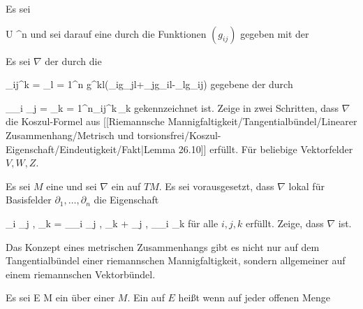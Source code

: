 {}
{

Es sei

\mavergleichskette
{\vergleichskette
{ U
}
{ \subseteq }{ \R^n
}
{  }{
}
{    }{
}
{   }{
}
}
{}{}{}
und sei darauf eine
durch die Funktionen $\left(  g_{ij}  \right)$ gegeben mit der

 Es sei $\nabla$ der durch die

\mavergleichskettedisp
{\vergleichskette
{ \Gamma_{ij}^k
}
{ =} { {  } \sum_{l = 1}^n g^{kl}(\partial_ig_{jl}+\partial_jg_{il}-\partial_lg_{ij})
}
{ } {
}
{ } {
}
{ } {
}
}
{}{}{}
gegebene
der durch

\mavergleichskettedisp
{\vergleichskette
{ \nabla_{\partial_i } \partial_j
}
{ =} { \sum_{k = 1}^n\Gamma_{ij}^k\,\partial_k
}
{ } {
}
{ } {
}
{ } {
}
}
{}{}{}
gekennzeichnet ist. Zeige in zwei Schritten, dass $\nabla$ die Koszul-Formel aus
[[Riemannsche Mannigfaltigkeit/Tangentialbündel/Linearer Zusammenhang/Metrisch und torsionsfrei/Koszul-Eigenschaft/Eindeutigkeit/Fakt|Lemma 26.10]]
erfüllt.
 {Für beliebige Vektorfelder $V,W,Z$.
}

}
{} {}

{}
{

Es sei $M$ eine
und sei $\nabla$ ein
auf $TM$. Es sei vorausgesetzt, dass $\nabla$ lokal für Basisfelder $\partial_1  , \ldots , \partial_n$ die Eigenschaft

\mavergleichskettedisp
{\vergleichskette
{ \partial_i \left\langle  \partial_j  ,  \partial_k   \right\rangle
}
{ =} { \left\langle \nabla_{\partial_i } \partial_j   ,  \partial_k   \right\rangle  + \left\langle  \partial_j  ,  \nabla_{\partial_i } \partial_k    \right\rangle
}
{ } {
}
{ } {
}
{ } {
}
}
{}{}{}
für alle $i,j,k$ erfüllt. Zeige, dass $\nabla$
ist.

}
{} {}

Das Konzept eines metrischen Zusammenhangs gibt es nicht nur auf dem Tangentialbündel einer riemannschen Mannigfaltigkeit, sondern allgemeiner auf einem riemannschen Vektorbündel.

Es sei
 { E } { M
} {}
ein
über einer
$M$. Ein
auf $E$ heißt
wenn auf jeder offenen Menge

